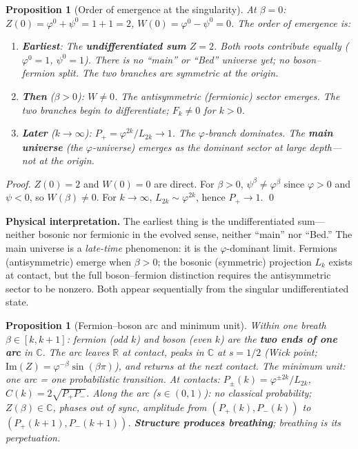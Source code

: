 \documentclass[12pt,a4paper]{article}
\newtheorem{proposition}[theorem]{Proposition}
\begin{document}
\begin{proposition}[Order of emergence at the singularity]
\label{prop:singularity-order}
At $\beta = 0$: $Z(0) = \varphi^0 + \psi^0 = 1 + 1 = 2$, $W(0) = \varphi^0 - \psi^0 = 0$. The order of emergence is:

\begin{enumerate}[nosep]
\item \textbf{Earliest}: The \textbf{undifferentiated sum} $Z = 2$. Both roots contribute equally ($\varphi^0 = 1$, $\psi^0 = 1$). There is no ``main'' or ``Bed'' universe yet; no boson--fermion split. The two branches are symmetric at the origin.
\item \textbf{Then} ($\beta > 0$): $W \neq 0$. The antisymmetric (fermionic) sector emerges. The two branches begin to differentiate; $F_k \neq 0$ for $k > 0$.
\item \textbf{Later} ($k \to \infty$): $P_+ = \varphi^{2k}/L_{2k} \to 1$. The $\varphi$-branch dominates. The \textbf{main universe} (the $\varphi$-universe) emerges as the dominant sector at large depth---not at the origin.
\end{enumerate}
\end{proposition}

\begin{proof}
$Z(0) = 2$ and $W(0) = 0$ are direct. For $\beta > 0$, $\psi^\beta \neq \varphi^\beta$ since $\varphi > 0$ and $\psi < 0$, so $W(\beta) \neq 0$. For $k \to \infty$, $L_{2k} \sim \varphi^{2k}$, hence $P_+ \to 1$. \qed
\end{proof}

\noindent\textbf{Physical interpretation.} The earliest thing is the undifferentiated sum---neither bosonic nor fermionic in the evolved sense, neither ``main'' nor ``Bed.'' The main universe is a \emph{late-time} phenomenon: it is the $\varphi$-dominant limit. Fermions (antisymmetric) emerge when $\beta > 0$; the bosonic (symmetric) projection $L_k$ exists at contact, but the full boson--fermion distinction requires the antisymmetric sector to be nonzero. Both appear sequentially from the singular undifferentiated state.

\begin{proposition}[Fermion--boson arc and minimum unit]
\label{prop:fermion-boson-structure}
\label{prop:twin-breathing}
\label{prop:minimum-unit}
\label{prop:min-unit-probability}
Within one breath $\beta \in [k, k+1]$: fermion (odd $k$) and boson (even $k$) are the \textbf{two ends of one arc} in $\mathbb{C}$. The arc leaves $\mathbb{R}$ at contact, peaks in $\mathbb{C}$ at $s=1/2$ (Wick point; $\mathrm{Im}(Z)=\varphi^{-\beta}\sin(\beta\pi)$), and returns at the next contact. The minimum unit: one arc = one probabilistic transition. At contacts: $P_\pm(k)=\varphi^{\pm 2k}/L_{2k}$, $C(k)=2\sqrt{P_+P_-}$. Along the arc ($s \in (0,1)$): no classical probability; $Z(\beta) \in \mathbb{C}$, phases out of sync, amplitude from $(P_+(k),P_-(k))$ to $(P_+(k+1),P_-(k+1))$. \textbf{Structure produces breathing}; breathing is its perpetuation.
\end{proposition}
\end{document}
